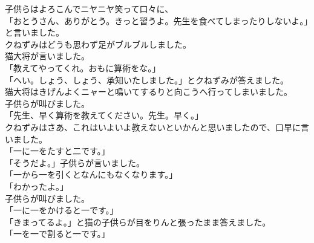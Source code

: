 \documentclass[
a4paper,
10pt,
book]
{tarticle}
\begin{document}
\newpage
\thispagestyle{fancy}
\fancyhead[R]{\empty}
\indent 子供らはよろこんでニヤニヤ笑って口々に、\\
「おとうさん、ありがとう。きっと習うよ。先生を食べてしまったりしないよ。」と言いました。\\
\indent クねずみはどうも思わず足がブルブルしました。\\
\indent 猫大将が言いました。\\
「教えてやってくれ。おもに算術をな。」\\
「へい。しょう、しょう、承知いたしました。」とクねずみが答えました。\\
\indent 猫大将はきげんよくニャーと鳴いてするりと向こうへ行ってしまいました。\\
\indent 子供らが叫びました。\\
「先生、早く算術を教えてください。先生。早く。」\\
\indent クねずみはさあ、これはいよいよ教えないといかんと思いましたので、口早に言いました。\\
「一に一をたすと二です。」\\
「そうだよ。」子供らが言いました。\\
「一から一を引くとなんにもなくなります。」\\
「わかったよ。」\\
\indent 子供らが叫びました。\\
「一に一をかけると一です。」\\
「きまってるよ。」と猫の子供らが目をりんと張ったまま答えました。\\
「一を一で割ると一です。」
\end{document}

